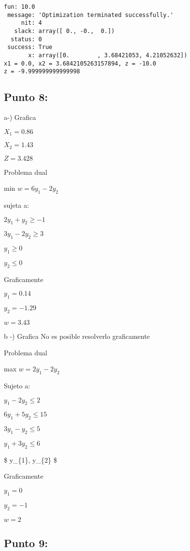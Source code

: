 \documentclass[11pt]{article}
\begin{document}
    \begin{Verbatim}[commandchars=\\\{\}]
     fun: 10.0
 message: 'Optimization terminated successfully.'
     nit: 4
   slack: array([ 0., -0.,  0.])
  status: 0
 success: True
       x: array([0.        , 3.68421053, 4.21052632])
x1 = 0.0, x2 = 3.6842105263157894, z = -10.0
z = -9.999999999999998

    \end{Verbatim}

    \subsection{Punto 8:}\label{punto-8}

a-) Grafica

\(X_{1} = 0.86\)

\(X_{2} = 1.43\)

\(Z = 3.428\)

Problema dual

min \(w = 6y_{1} - 2y_{2}\)

sujeta a:

\(2y_{1} + y_{2} \geq -1\)

\(3y_{1} - 2y_{2} \geq 3\)

\(y_{1} \geq 0\)

\(y_{2} \leq 0\)

Graficamente

\(y_{1} = 0.14\)

\(y_{2} = -1.29\)

\(w = 3.43\)

b -) Grafica No es posible resolverlo graficamente

Problema dual

max \(w = 2y_{1} - 2y_{2}\)

Sujeto a:

\(y_{1} - 2y_{2} \leq 2\)

\(6y_{1} + 5y_{2} \leq 15\)

\(3y_{1} - y_{2} \leq 5\)

\(y_{1} + 3y_{2} \leq 6\)

\$ y\_\{1\}, y\_\{2\} \$

Graficamente

\(y_{1} = 0\)

\(y_{2} = -1\)

\(w = 2\)

    \subsection{Punto 9:}\label{punto-9}
\end{document}
